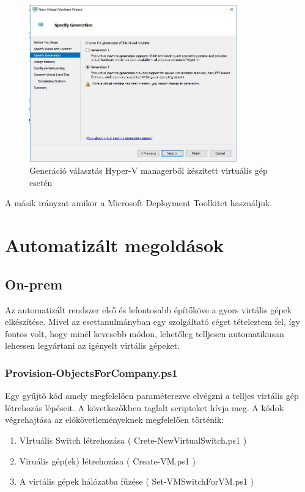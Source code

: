 \documentclass[12pt,oneside,justify]{book}
\begin{document}
 
\begin{figure}[h]
\centering
\includegraphics[width=0.8\textwidth]{generation_selection}
\caption{Generáció választás Hyper-V managerből készített virtuális gép esetén}
\label{fig:gen_selection}
\end{figure}


A másik irányzat amikor a Microsoft Deployment Toolkitet használjuk.

\section{Automatizált megoldások}


\subsection{On-prem}


Az automatizált rendszer első és lefontosabb építőköve a gyors virtális gépek elkészítése. Mivel az esettanulmányban egy szolgáltató céget tételeztem fel, így fontos volt, hogy minél kevesebb módon, lehetőleg telljesen automatikusan lehessen legyártani az igényelt virtális gépeket. 

\subsubsection{Provision-ObjectsForCompany.ps1}
Egy gyűjtő kód amely megfelelően paraméterezve elvégzni a telljes virtális gép létrehozás lépéseit. 
A következőkben taglalt scripteket hívja meg. 
A kódok végrehajtása az előkövetleményeknek megfelelően történik:
\begin{enumerate}
	\item VIrtuális Switch létrehozása ( Crete-NewVirtualSwitch.ps1 )
	\item Viruális gép(ek) létrehozása ( Create-VM.ps1 )
	\item A virtális gépek hálózatba fűzése ( Set-VMSwitchForVM.ps1 )
\end{enumerate}
\end{document}
